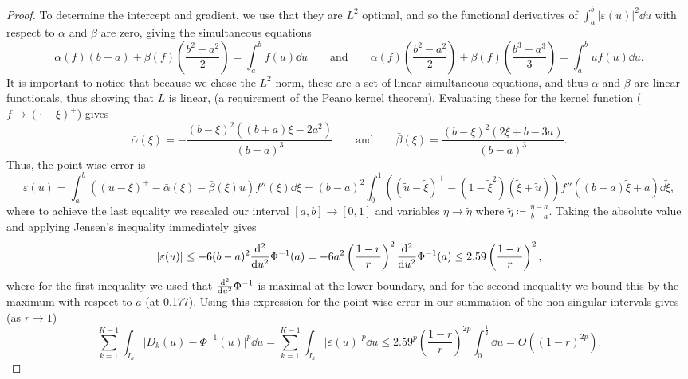 \documentclass[manuscript,review]{acmart}
\begin{document}
\begin{proof}
To determine the intercept and gradient, we use that they are $ L^2 $ optimal, and so the functional derivatives of $ \int_a^b \lvert \varepsilon(u) \rvert^2 \dd{u} $ with respect to $ \alpha $ and $ \beta $ are zero, giving the simultaneous equations
\begin{equation*}
\alpha(f)(b-a) + \beta(f) \left(\dfrac{b^2 - a^2}{2}\right)  = \int_{a}^{b} f(u) \dd{u} 
\qquad \text{and} \qquad 
\alpha(f)\left(\dfrac{b^2 - a^2}{2}\right) + \beta(f) \left(\dfrac{b^3 - a^3}{3}\right)  = \int_{a}^{b} u f(u) \dd{u}.
\end{equation*}
It is important to notice that because we chose the $ L^2 $ norm, these are a set of linear simultaneous equations, and thus $ \alpha $ and $ \beta $ are linear functionals, thus showing that $ L $ is linear, (a requirement of the Peano kernel theorem). Evaluating these for the kernel function ($ f \to (\cdot - \xi)^+  $) gives
\begin{equation*}
\bar{\alpha}(\xi)  = - \dfrac{(b - \xi)^2 ((b+a)\xi - 2a^2)}{(b - a)^3} 
\qquad \text{and} \qquad 
\label{eqt:peano_kernel_coefficient}
\bar{\beta}(\xi) = \dfrac{(b - \xi)^2 (2\xi + b - 3a)}{(b - a)^3}.
\end{equation*}
Thus, the point wise error is 
\begin{equation*}
\varepsilon(u)  = \int_{a}^{b} ((u - \xi)^+ - \bar{\alpha}(\xi) - \bar{\beta}(\xi) u ) f''(\xi) \dd{\xi} = (b - a)^2 \int_{0}^{1} ((\widetilde{u} - \widetilde{\xi})^+ - (1 - \widetilde{\xi}^2)(\widetilde{\xi} + \widetilde{u})) f''((b - a)\widetilde{\xi} + a) \dd{\widetilde{\xi}},
\end{equation*}
where to achieve the last equality we rescaled our interval $ [a, b] \to [0, 1] $  and variables $ \eta \to \widetilde{\eta}  $ where $ \widetilde{\eta} \coloneqq \tfrac{\eta - a}{b - a} $. Taking the absolute value and applying Jensen's inequality immediately gives 
\begin{equation*}
\lvert \varepsilon(u) \rvert \leq - 6 (b - a)^2  {\dv[2]{}{u}}\Phi^{-1}(a) = - 6 a^2 \left(\dfrac{1-r}{r}\right)^2  {\dv[2]{}{u}}\Phi^{-1}(a) \leq 2.59 \left(\dfrac{1-r}{r}\right)^2,
\end{equation*}
where for the first inequality we used that $ {\dv[2]{}{u}}\Phi^{-1} $ is maximal at the lower boundary, and for the second inequality we bound this by the maximum with respect to $ a $ (at 0.177). Using this expression for the point wise error in our summation of the non-singular intervals gives (as $ r \to 1 $)
\begin{equation*}
 \sum_{k=1}^{K-1} \int_{I_k} \lvert D_k(u) - \Phi^{-1}(u)\rvert^p \dd{u}
= \sum_{k = 1}^{K - 1} \int_{I_k} \lvert\varepsilon(u)\rvert^p \dd{u}
\leq 2.59^p \left(\dfrac{1 - r}{r}\right)^{2p}  \int_{0}^{\frac{1}{2}} \dd{u}
= O((1-r)^{2p}).
\end{equation*}


\end{proof}
\end{document}
